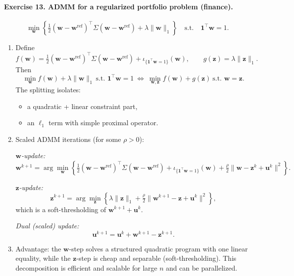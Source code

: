 \documentclass[11pt]{article}
\begin{document}
\bigskip

\paragraph{Exercise 13. ADMM for a regularized portfolio problem (finance).}

\[
\min_{\bm{w}}
\left\{
\tfrac12(\bm{w}-\bm{w}^{\mathrm{ref}})^\top\Sigma(\bm{w}-\bm{w}^{\mathrm{ref}})
+ \lambda\|\bm{w}\|_1
\right\}
\quad\text{s.t.}\quad \bm{1}^\top\bm{w}=1.
\]

\begin{enumerate}
\item Define
\[
f(\bm{w})
=
\tfrac12(\bm{w}-\bm{w}^{\mathrm{ref}})^\top\Sigma(\bm{w}-\bm{w}^{\mathrm{ref}})
+ \iota_{\{\bm{1}^\top\bm{w}=1\}}(\bm{w}),
\qquad
g(\bm{z}) = \lambda\|\bm{z}\|_1.
\]
Then
\[
\min_{\bm{w}} f(\bm{w})+\lambda\|\bm{w}\|_1
\ \text{s.t. }\bm{1}^\top\bm{w}=1
\ \Longleftrightarrow\ 
\min_{\bm{w},\bm{z}} f(\bm{w})+g(\bm{z})
\ \text{s.t. }\bm{w}=\bm{z}.
\]
The splitting isolates:
\begin{itemize}
\item a quadratic + linear constraint part,
\item an $\ell_1$ term with simple proximal operator.
\end{itemize}

\item Scaled ADMM iterations (for some $\rho>0$):

\emph{$\bm{w}$-update:}
\[
\bm{w}^{k+1}
=
\arg\min_{\bm{w}}
\left\{
\tfrac12(\bm{w}-\bm{w}^{\mathrm{ref}})^\top\Sigma(\bm{w}-\bm{w}^{\mathrm{ref}})
+ \iota_{\{\bm{1}^\top\bm{w}=1\}}(\bm{w})
+ \tfrac{\rho}{2}\|\bm{w}-\bm{z}^k+\bm{u}^k\|^2
\right\}.
\]

\emph{$\bm{z}$-update:}
\[
\bm{z}^{k+1}
=
\arg\min_{\bm{z}}
\left\{
\lambda\|\bm{z}\|_1
+ \tfrac{\rho}{2}\|\bm{w}^{k+1}-\bm{z}+\bm{u}^k\|^2
\right\},
\]
which is a soft-thresholding of $\bm{w}^{k+1}+\bm{u}^k$.

\emph{Dual (scaled) update:}
\[
\bm{u}^{k+1}
=
\bm{u}^k + \bm{w}^{k+1} - \bm{z}^{k+1}.
\]

\item Advantage: the $\bm{w}$-step solves a structured quadratic program with one linear equality, while the $\bm{z}$-step is cheap and separable (soft-thresholding).  
This decomposition is efficient and scalable for large $n$ and can be parallelized.
\end{enumerate}

\bigskip
\end{document}
